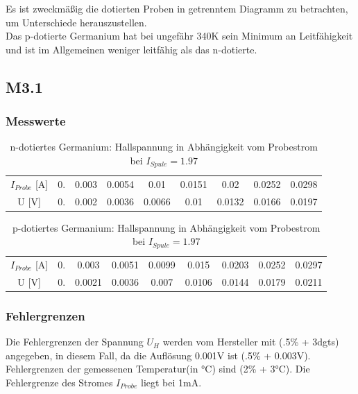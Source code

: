 Es ist zweckmäßig die dotierten Proben in getrenntem Diagramm zu betrachten, um Unterschiede herauszustellen.\\
Das p-dotierte Germanium hat bei ungefähr 340K sein Minimum an Leitfähigkeit und ist im Allgemeinen weniger leitfähig als das n-dotierte. \\

\subsection{M3.1}
\subsubsection{Messwerte}
\begin{table}[H]
\centering
\begin{tabular}{|c||c|c|c|c|c|c|c|c|}
\hline
$I_{Probe}$ [A] & 0. & 0.003 & 0.0054 & 0.01 & 0.0151 & 0.02 & 0.0252 & 0.0298 \\
 U [V] & 0. & 0.002 & 0.0036 & 0.0066 & 0.01 & 0.0132 & 0.0166 & 0.0197 \\
 \hline
\end{tabular}
\caption{n-dotiertes Germanium: Hallspannung in Abhängigkeit vom Probestrom bei $I_{Spule}= 1.97$}
\end{table} 

\begin{table}[H]
\centering
\begin{tabular}{|c||c|c|c|c|c|c|c|c|}
\hline
$I_{Probe}$ [A] & 0. & 0.003 & 0.0051 & 0.0099 & 0.015 & 0.0203 & 0.0252 & 0.0297 \\
 U [V] & 0. & 0.0021 & 0.0036 & 0.007 & 0.0106 & 0.0144 & 0.0179 & 0.0211 \\ 
 \hline
\end{tabular}
\caption{p-dotiertes Germanium: Hallspannung in Abhängigkeit vom Probestrom bei $I_{Spule}= 1.97$}
\end{table} 

\subsubsection{Fehlergrenzen}
Die Fehlergrenzen der Spannung $U_{H}$ werden vom Hersteller mit (.5\% + 3dgts) angegeben, in diesem Fall, da die Auflösung 0.001V ist (.5\% + 0.003V). Fehlergrenzen der gemessenen Temperatur(in °C) sind (2\% + 3°C). Die Fehlergrenze des Stromes $I_{Probe}$ liegt bei 1mA.\\

